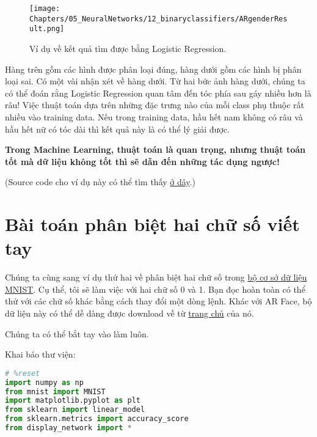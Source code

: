\begin{figure}[t]
 \centering
     \texttt{[image: Chapters/05\_NeuralNetworks/12\_binaryclassifiers/ARgenderResult.png]}
     \caption[]{Ví dụ về kết quả tìm được bằng Logistic Regression.}
     \label{fig:12_2}
 \end{figure} 
Hàng trên gồm các hình được phân loại đúng, hàng dưới gồm các hình bị phân loại sai. Có một vài nhận xét về hàng dưới. Từ hai bức ảnh hàng dưới, chúng ta có thể đoán rằng Logistic Regression quan tâm đến tóc phía sau gáy nhiều hơn là râu! Việc thuật toán dựa trên những đặc trưng nào của mỗi class phụ thuộc rất nhiều vào training data. Nếu trong training data, hầu hết nam không có râu và hầu hết nữ có tóc dài thì kết quả này là có thể lý giải được.  
 
\textbf{Trong Machine Learning, thuật toán là quan trọng, nhưng thuật toán tốt mà dữ liệu không tốt thì sẽ dẫn đến những tác dụng ngược!} 
 
(Source code cho ví dụ này có thể tìm thấy \href{https://github.com/tiepvupsu/tiepvupsu.github.io/blob/master/assets/LogReg2/ARGender.ipynb}{ở dây}.) 
 
\section{Bài toán phân biệt hai chữ số viết tay }
Chúng ta cùng sang ví dụ thứ hai về phân biệt hai chữ số trong \href{http://machinelearningcoban.com/2017/01/04/kmeans2/#bo-co-so-du-lieu-mnist}{bộ cơ sở dữ liệu MNIST}. Cụ thể, tôi sẽ làm việc với hai chữ số 0 và 1. Bạn đọc hoàn toàn có thể thử với các chữ số khác bằng cách thay đổi một dòng lệnh. Khác với AR Face, bộ dữ liệu này có thể dễ dàng được download về từ \href{http://yann.lecun.com/exdb/mnist/}{trang chủ} của nó. 
 
Chúng ta có thể bắt tay vào làm luôn.  
 
Khai báo thư viện: 
 
\begin{lstlisting}[language=Python]
# %reset 
import numpy as np  
from mnist import MNIST 
import matplotlib.pyplot as plt 
from sklearn import linear_model 
from sklearn.metrics import accuracy_score 
from display_network import * 
\end{lstlisting}
 
